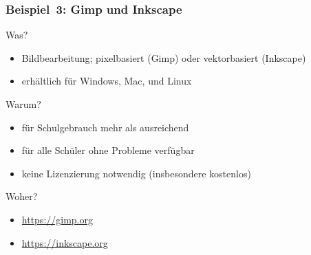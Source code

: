 \documentclass{beamer}
\begin{document}
\begin{frame}
  \frametitle{Beispiel~3: Gimp und Inkscape}

  \onslide<+->

  \begin{block}{Was?}
    \begin{itemize}
    \item Bildbearbeitung; pixelbasiert (Gimp) oder vektorbasiert (Inkscape)
    \item erhältlich für Windows, Mac, und Linux
    \end{itemize}
  \end{block}

  \onslide<+->

  \begin{block}{Warum?}
    \begin{itemize}
    \item für Schulgebrauch mehr als ausreichend
    \item für alle Schüler ohne Probleme verfügbar
    \item keine Lizenzierung notwendig (insbesondere kostenlos)
    \end{itemize}
  \end{block}

  \onslide<+->

  \begin{block}{Woher?}
    \begin{itemize}
    \item \url{https://gimp.org}
    \item \url{https://inkscape.org}
    \end{itemize}
  \end{block}


\end{frame}
\end{document}
